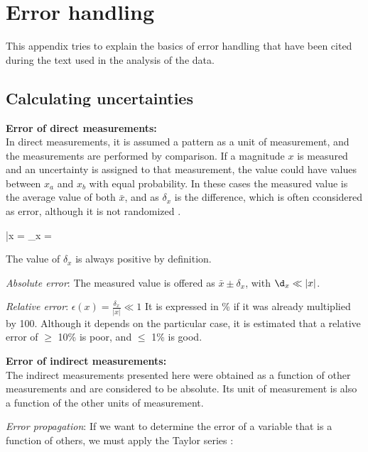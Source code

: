 \cleardoublepage
\chapter{Error handling}\label{chap:app3}


This appendix tries to explain the basics of error handling that have been cited during the text used in the analysis of the data.


\section{Calculating uncertainties}\label{sec:unc}

\ben
	\item \textbf{Error of direct measurements:}\\[12pt]
In direct measurements, it is assumed a pattern as a unit of measurement, and the measurements are performed by comparison. If a magnitude $x$ is measured and an uncertainty is assigned to that measurement, the value could have values between $x_a$ and $x_b$ with equal probability. In these cases the measured value is the average value of both $\bar{x}$, and as $\delta_x$ is the difference, which is often cconsidered as error, although it is not randomized \cite{san:89}.

\be \bar{x} =  \quad \delta_x = \ee

The value of $\delta_x$ is always positive by definition.

	\bi
		\item \textit{Absolute error}: The measured value is offered as $\bar{x} \pm \delta_x$, with $\d_x \ll \left| x \right|$.
		\item \textit{Relative error}: $\epsilon(x) = \frac{\delta_x}{\left|x\right|} \ll 1$ It is expressed in \% if it was already multiplied by 100. Although it depends on the particular case, it is estimated that a relative error of $\geq$ 10\% is poor, and $\leq$ 1\% is good.
	\ei

	\item \textbf{Error of indirect measurements:}\label{item:ind}\\[12pt]
The indirect measurements presented here were obtained as a function of other measurements and are considered to be absolute. Its unit of measurement is also a function of the other units of measurement.

	\bi
		\item \textit{Error propagation}: If we want to determine the error of a variable that is a function of others, we must apply the Taylor series \cite{san:89}:

